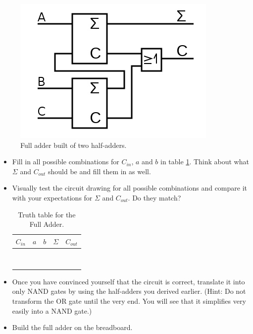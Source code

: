 \documentclass[10pt,a4paper]{article}
\begin{document}
\begin{figure}[H]
	\centering		  
	\includegraphics[scale=0.3]{full_adder.png}
	\caption{Full adder built of two half-adders.}
	\label{fig:full-adder}
\end{figure}
\begin{itemize}
	\item Fill in all possible combinations for $C_{in}$, $a$ and $b$ in table \ref{tab:full-adder-truth-table}. Think about what $\Sigma$ and $C_{out}$ should be and fill them in as well.
	\item Visually test the circuit drawing for all possible combinations and compare it with your expectations for $\Sigma$ and $C_{out}$. Do they match?
	
	\begin{table}[h]
		\centering
		\begin{tabular}{|c|c|c||c|c|}
			\hline
			$C_{in}$ & $a$ & $b$ & $\Sigma$ & $C_{out}$ \\ \hline
			&     &     &          &           \\ \hline
			&     &     &          &           \\ \hline
			&     &     &          &           \\ \hline
			&     &     &          &           \\ \hline
			&     &     &          &           \\ \hline
			&     &     &          &           \\ \hline
			&     &     &          &           \\ \hline
			&     &     &          &           \\ \hline
		\end{tabular}
		\caption{Truth table for the Full Adder.}
		\label{tab:full-adder-truth-table}
	\end{table}
	
	\item Once you have convinced yourself that the circuit is correct, translate it into only NAND gates by using the half-adders you derived earlier. (Hint: Do not transform the OR gate until the very end. You will see that it simplifies very easily into a NAND gate.)
	\item Build the full adder on the breadboard.
\end{itemize}
\end{document}
